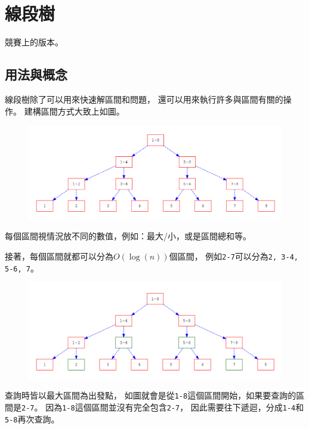 \section{線段樹}
    競賽上的版本。

    \subsection{用法與概念}

    線段樹除了可以用來快速解區間和問題，
    還可以用來執行許多與區間有關的操作。
    建構區間方式大致上如圖。

    \begin{figure}
        \centering
        \includegraphics[width=\textwidth]{../Images/SEG.png}
    \end{figure}

    每個區間視情況放不同的數值，例如：最大/小，或是區間總和等。

    接著，每個區間就都可以分為$O(\log{(n)})$個區間，
    例如\verb|2-7|可以分為\verb|2, 3-4, 5-6, 7|。

    \begin{figure}
        \centering
        \includegraphics[width=\textwidth]{../Images/SEG2.png}
    \end{figure}

    查詢時皆以最大區間為出發點，
    如圖就會是從\verb|1-8|這個區間開始，如果要查詢的區間是\verb|2-7|。
    因為\verb|1-8|這個區間並沒有完全包含\verb|2-7|，
    因此需要往下遞迴，分成\verb|1-4|和\verb|5-8|再次查詢。


